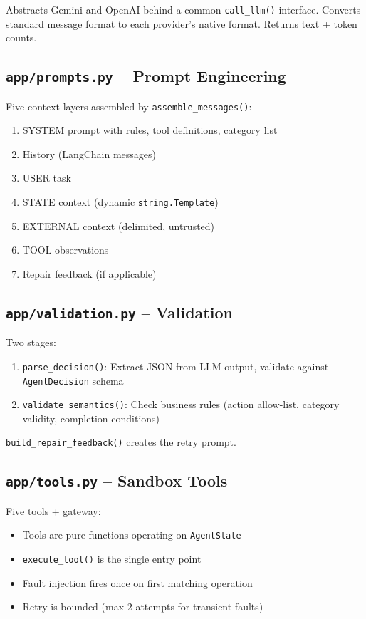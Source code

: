 \documentclass[12pt,a4paper]{article}
\begin{document}
Abstracts Gemini and OpenAI behind a common \texttt{call\_llm()} interface. Converts standard message format to each provider's native format. Returns text + token counts.

\subsection{\texttt{app/prompts.py} -- Prompt Engineering}

Five context layers assembled by \texttt{assemble\_messages()}:
\begin{enumerate}
  \item SYSTEM prompt with rules, tool definitions, category list
  \item History (LangChain messages)
  \item USER task
  \item STATE context (dynamic \texttt{string.Template})
  \item EXTERNAL context (delimited, untrusted)
  \item TOOL observations
  \item Repair feedback (if applicable)
\end{enumerate}

\subsection{\texttt{app/validation.py} -- Validation}

Two stages:
\begin{enumerate}
  \item \texttt{parse\_decision()}: Extract JSON from LLM output, validate against \texttt{AgentDecision} schema
  \item \texttt{validate\_semantics()}: Check business rules (action allow-list, category validity, completion conditions)
\end{enumerate}

\texttt{build\_repair\_feedback()} creates the retry prompt.

\subsection{\texttt{app/tools.py} -- Sandbox Tools}

Five tools + gateway:
\begin{itemize}
  \item Tools are pure functions operating on \texttt{AgentState}
  \item \texttt{execute\_tool()} is the single entry point
  \item Fault injection fires once on first matching operation
  \item Retry is bounded (max 2 attempts for transient faults)
\end{itemize}
\end{document}
